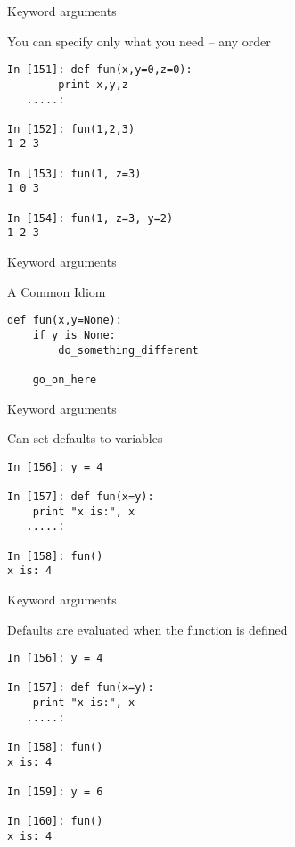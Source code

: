 \documentclass{beamer}
\begin{document}
\begin{frame}[fragile]{Keyword arguments}

 {\Large You can specify only what you need -- any order}

\begin{verbatim}
In [151]: def fun(x,y=0,z=0):
        print x,y,z
   .....:     

In [152]: fun(1,2,3)
1 2 3

In [153]: fun(1, z=3)
1 0 3

In [154]: fun(1, z=3, y=2)
1 2 3
\end{verbatim}

\end{frame} 

\begin{frame}[fragile]{Keyword arguments}

 {\Large A Common Idiom}

\vfill
\begin{verbatim}
def fun(x,y=None):
    if y is None:
        do_something_different

    go_on_here
\end{verbatim}
\vfill

\end{frame} 

\begin{frame}[fragile]{Keyword arguments}

 {\Large Can set defaults to variables}

\begin{verbatim}
In [156]: y = 4

In [157]: def fun(x=y):
    print "x is:", x
   .....:     

In [158]: fun()
x is: 4

\end{verbatim}

\end{frame} 

\begin{frame}[fragile]{Keyword arguments}

{\Large Defaults are evaluated when the function is defined}

\begin{verbatim}
In [156]: y = 4

In [157]: def fun(x=y):
    print "x is:", x
   .....:     

In [158]: fun()
x is: 4

In [159]: y = 6

In [160]: fun()
x is: 4
\end{verbatim}

\end{frame} 
\end{document}

